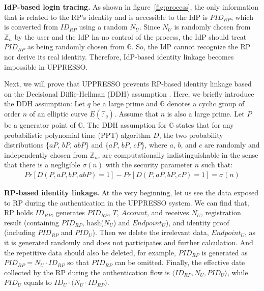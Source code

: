 \noindent\textbf{IdP-based login tracing.}
As shown in figure~\ref{fig:process}, the only information that is related to the RP's identity and is accessible to the IdP is $PID_{RP}$, which is converted from $ID_{RP}$ using a random $N_U$. Since $N_U$ is randomly chosen from $\mathbb{Z}_n$ by the user and the IdP ha no control of the process, the IdP should treat $PID_{RP}$ as being randomly chosen from $\mathbb{G}$. So, the IdP cannot recognize the RP nor derive its real identity. Therefore, IdP-based identity linkage becomes impossible in UPPRESSO.

Next, we will prove that UPPRESSO prevents RP-based identity linkage based on the Decisional Diffie-Hellman (DDH) assumption \cite{GoldwasserK16}. Here, we briefly introduce the DDH assumption:
Let $q$ be a large prime and $\mathbb{G}$ denotes a cyclic group of order $n$ of an elliptic curve $E(\mathbb{F}_q)$.
Assume that $n$ is also a large prime. Let $P$ be a generator point of $\mathbb{G}$. The DDH assumption for $\mathbb{G}$ states that for any probabilistic polynomial time (PPT) algorithm $D$, the two probability distributions \{$aP$, $bP$, $abP$\} and \{$aP$, $bP$, $cP$\}, where $a$, $b$, and $c$ are randomly and independently chosen from $\mathbb{Z}_n$, are computationally indistinguishable in the sense that there is a negligible $\sigma(n)$ with the security parameter $n$ such that:
\vspace{-\topsep}
\begin{multline*}
Pr[D(P, aP, bP, abP)=1]-Pr[D(P, aP, bP, cP)=1]=\sigma(n)
\end{multline*}
\vspace{-\topsep}

\vspace{-2mm}
\noindent\textbf{RP-based identity linkage.}
At the very beginning, let us see the data exposed to RP during the authentication in the UPPRESSO system.
We can find that, RP holds $ID_{RP}$,  generates $PID_{RP}$, $T$, $Account$, and receives $N_U$, registration result (containing $PID_{RP}$, hash($N_U$) and $Endpoint_U$), and identity proof (including $PID_{RP}$ and $PID_U$). Then we delete the irrelevant data, $Endpoint_U$, as it is generated randomly and does not participates and further calculation. And the repetitive data should also be deleted, for example, $PID_{RP}$ is generated as $PID_{RP}=N_U \cdot {ID_{RP}}$ so that $PID_{RP}$ can be omitted. Finally, the effective date collected by the RP during the authentication flow is $\langle ID_{RP}, N_U, PID_U\rangle$, while $PID_U$ equals to $ID_U \cdot{(N_U \cdot {ID_{RP})}}$.


